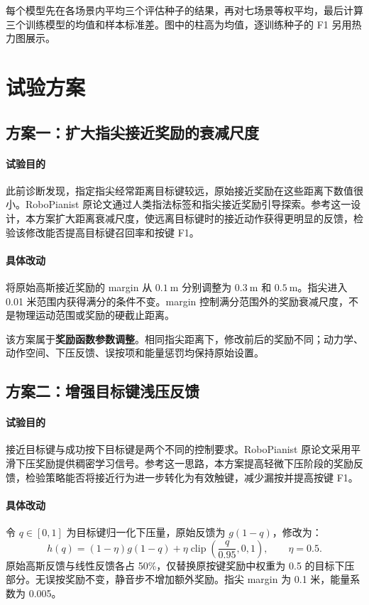\documentclass[UTF8,a4paper,11pt]{ctexart}
\begin{document}
每个模型先在各场景内平均三个评估种子的结果，再对七场景等权平均，最后计算三个训练模型的均值和样本标准差。图中的柱高为均值，逐训练种子的 F1 另用热力图展示。

\section{试验方案}

\subsection{方案一：扩大指尖接近奖励的衰减尺度}

\paragraph{试验目的}
此前诊断发现，指定指尖经常距离目标键较远，原始接近奖励在这些距离下数值很小。RoboPianist 原论文通过人类指法标签和指尖接近奖励引导探索\cite{robopianist}。参考这一设计，本方案扩大距离衰减尺度，使远离目标键时的接近动作获得更明显的反馈，检验该修改能否提高目标键召回率和按键 F1。

\paragraph{具体改动}
将原始高斯接近奖励的 margin 从 $0.1\ \mathrm{m}$ 分别调整为 $0.3\ \mathrm{m}$ 和 $0.5\ \mathrm{m}$。指尖进入 0.01 米范围内获得满分的条件不变。margin 控制满分范围外的奖励衰减尺度，不是物理运动范围或奖励的硬截止距离。

该方案属于\textbf{奖励函数参数调整}。相同指尖距离下，修改前后的奖励不同；动力学、动作空间、下压反馈、误按项和能量惩罚均保持原始设置。

\subsection{方案二：增强目标键浅压反馈}

\paragraph{试验目的}
接近目标键与成功按下目标键是两个不同的控制要求。RoboPianist 原论文采用平滑下压奖励提供稠密学习信号\cite{robopianist}。参考这一思路，本方案提高轻微下压阶段的奖励反馈，检验策略能否将接近行为进一步转化为有效触键，减少漏按并提高按键 F1。

\paragraph{具体改动}
令 $q\in[0,1]$ 为目标键归一化下压量，原始反馈为 $g(1-q)$，修改为：
\begin{equation}
h(q)=(1-\eta)g(1-q)+
\eta\operatorname{clip}\left(\frac{q}{0.95},0,1\right),
\qquad \eta=0.5.
\end{equation}
原始高斯反馈与线性反馈各占 50\%，仅替换原按键奖励中权重为 0.5 的目标下压部分。无误按奖励不变，静音步不增加额外奖励。指尖 margin 为 0.1 米，能量系数为 0.005。
\end{document}
